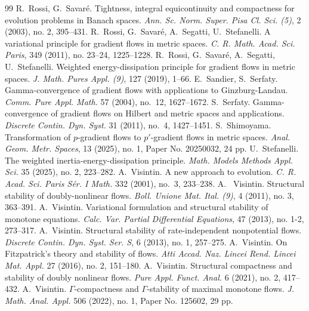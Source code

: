 \documentclass[10pt,a4paper]{amsart}
\begin{document}
\begin{thebibliography}{99}
 R.~Rossi, G.~Savar\'e. Tightness, integral equicontinuity and compactness for evolution problems in Banach spaces. {\it Ann. Sc. Norm. Super. Pisa Cl. Sci. (5)}, 2 (2003), no. 2, 395--431.
 R.~Rossi, G.~Savar\'e, A.~Segatti, U.~Stefanelli. A variational principle for gradient flows in metric spaces. {\it C. R. Math. Acad. Sci. Paris}, 349 (2011), no. 23--24, 1225--1228.
 R.~Rossi, G.~Savar\'e, A.~Segatti, U.~Stefanelli. Weighted energy-dissipation principle for gradient flows in metric spaces. {\it J. Math. Pures Appl. (9)}, 127 (2019), 1--66.
 E.~Sandier, S.~Serfaty. Gamma-convergence of gradient flows with applications to {G}inzburg-{L}andau. {\it Comm. Pure Appl. Math.} 57 (2004), no.~12, 1627--1672.
 S.~Serfaty. Gamma-convergence of gradient flows on Hilbert and metric spaces and applications. {\it Discrete Contin. Dyn. Syst.} 31 (2011), no.~4, 1427--1451.
 S.~Shimoyama. Transformation of $p$-gradient flows to $p'$-gradient flows in metric spaces. {\it Anal. Geom. Metr. Spaces}, 13 (2025), no. 1, Paper No. 20250032, 24 pp.
 U.~Stefanelli. The weighted inertia-energy-dissipation principle. {\it Math. Models Methods Appl. Sci.} 35 (2025), no. 2, 223--282.
 {A.~Visintin}. {A new approach to evolution}. {\it C. R. Acad. Sci. Paris S\'er. I Math.} 332 (2001), no.~3, 233--238.
 A.~ Visintin. Structural stability of doubly-nonlinear flows. {\it Boll. Unione Mat. Ital. (9)}, 4 (2011), no. 3, 363--391.
 A.~Visintin. Variational formulation and structural stability of monotone equations. {\it Calc. Var. Partial Differential Equations}, 47 (2013), no. 1-2, 273--317.
 A.~Visintin. Structural stability of rate-independent nonpotential flows. {\it Discrete Contin. Dyn. Syst. Ser. S}, 6 (2013), no. 1, 257--275.
 A.~Visintin. On Fitzpatrick's theory and stability of flows. {\it Atti Accad. Naz. Lincei Rend. Lincei Mat. Appl.} 27 (2016), no. 2, 151--180.
 A.~Visintin. Structural compactness and stability of doubly nonlinear flows. {\it Pure Appl. Funct. Anal.} 6 (2021), no. 2, 417--432.
 A.~Visintin. $\Gamma$-compactness and $\Gamma$-stability of maximal monotone flows. {\it J. Math. Anal. Appl.} 506 (2022), no. 1, Paper No. 125602, 29 pp.

\end{thebibliography}
\end{document}
